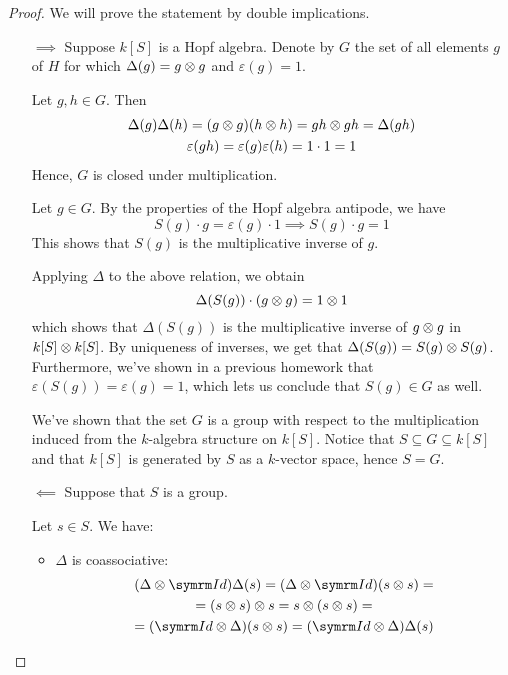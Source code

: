 \begin{proof}
We will prove the statement by double implications.
\begin{itemize}
    \item[\(\implies\)] Suppose \(k[S]\) is a Hopf algebra. Denote by \(G\) the set of all elements \(g\) of \(H\) for which \(\Delta(g) = g \otimes g\) and \(\varepsilon(g) = 1\).

    Let \(g, h \in G\). Then
    \begin{gather*}
        \Delta(g) \Delta(h) = (g \otimes g) (h \otimes h) = gh \otimes gh = \Delta(gh) \\
        \varepsilon(gh) = \varepsilon(g) \varepsilon(h) = 1 \cdot 1 = 1
    \end{gather*}
    Hence, \(G\) is closed under multiplication.

    Let \(g \in G\). By the properties of the Hopf algebra antipode, we have
    \[
        S(g) \cdot g = \varepsilon(g) \cdot 1 \implies S(g) \cdot g = 1
    \]
    This shows that \(S(g)\) is the multiplicative inverse of \(g\).
    
    Applying \(\Delta\) to the above relation, we obtain
    \[
        \Delta(S(g)) \cdot (g \otimes g) = 1 \otimes 1
    \]
    which shows that \(\Delta(S(g))\) is the multiplicative inverse of \(g \otimes g\) in \(k[S] \otimes k[S]\). By uniqueness of inverses, we get that \(\Delta(S(g)) = S(g) \otimes S(g)\). Furthermore, we've shown in a previous homework that \(\varepsilon(S(g)) = \varepsilon(g) = 1\), which lets us conclude that \(S(g) \in G\) as well.

    We've shown that the set \(G\) is a group with respect to the multiplication induced from the \(k\)-algebra structure on \(k[S]\). Notice that \(S \subseteq G \subseteq k[S]\) and that \(k[S]\) is generated by \(S\) as a \(k\)-vector space, hence \(S = G\).

    \item[\(\impliedby\)] Suppose that \(S\) is a group.

    Let \(s \in S\). We have:

    \begin{itemize}
        \item \(\Delta\) is coassociative:
        \begin{gather*}
            (\Delta \tensor \Id) \Delta (s) = (\Delta \tensor \Id) (s \tensor s) = \\
            = (s \tensor s) \tensor s = s \tensor (s \tensor s) = \\
            = (\Id \tensor \Delta) (s \tensor s) = (\Id \tensor \Delta) \Delta (s)
        \end{gather*}


\end{itemize}
\end{itemize}
\end{proof}
